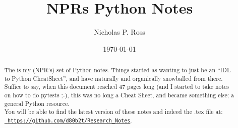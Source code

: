 \documentclass[11pt,a4paper]{article}
\begin{document}
\title{NPRs Python Notes}
\author{Nicholas P. Ross}
\date{\today}
\maketitle




\begin{abstract}
The is my (NPR's) set of Python notes.  Things started as wanting to
just be an ``IDL to Python CheatSheet'', and have naturally and organically 
snowballed from there.  
Suffice to say, when this document reached 47 pages long (and I started to 
take notes on how to do pytests ;-), this was no long a Cheat Sheet, and became 
something else; a general Python resource. \\

You will be able to find the latest version of these notes
and indeed the .tex file at:\\
\href{https://github.com/d80b2t/Research\_Notes}{\tt
https://github.com/d80b2t/Research\_Notes}.
\end{abstract}


\newpage
\tableofcontents


\newpage

\section*{}
\end{document}
